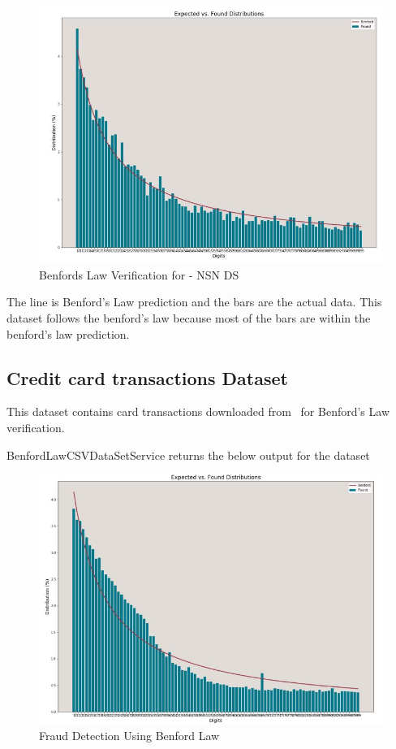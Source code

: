\begin{figure}[!ht]
\centering\includegraphics[width=\columnwidth]{images/benford_nsn.JPG}
  \caption{Benfords Law Verification for - NSN DS}\label{f:NSN-ds-benfordlaw}
\end{figure}

The line is Benford’s Law prediction and the bars are 
the actual data. This dataset follows the benford's law
because most of the bars are within the benford's law prediction.


\subsection{Credit card transactions Dataset}
This dataset contains card transactions downloaded 
from~\cite{hid-sp18-514-purchase-card-desc}
for Benford's Law verification.

BenfordLawCSVDataSetService returns the below
output for the dataset~\cite{hid-sp18-514-purchase-card-ds}

\begin{figure}[!ht]
\centering\includegraphics[width=\columnwidth]{images/ben_card_trx.JPG}
  \caption{Fraud Detection Using Benford Law}\label{f:card-ds-benfordlaw}
\end{figure}

